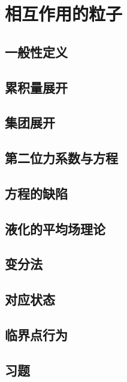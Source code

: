 \chapter{相互作用的粒子}

\section{一般性定义}
\section{累积量展开}
\section{集团展开}
\section{第二位力系数与{\vanDerWaals}方程}
\section{{\vanDerWaals}方程的缺陷}
\section{液化的平均场理论}
\section{变分法}
\section{对应状态}
\section{临界点行为}
\section*{习题}